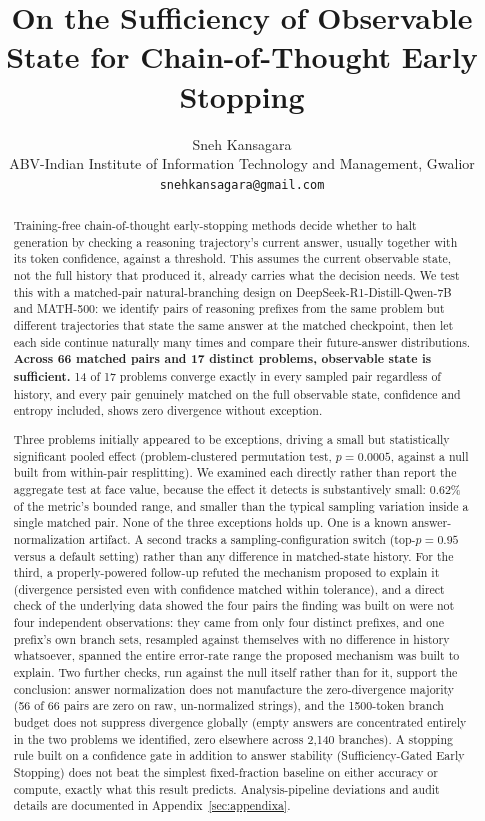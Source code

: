 \documentclass{article}
\title{On the Sufficiency of Observable State for Chain-of-Thought Early Stopping}
\author{%
  Sneh Kansagara \\
  ABV-Indian Institute of Information Technology and Management, Gwalior \\
  \texttt{snehkansagara@gmail.com} \\
}
\begin{document}
\maketitle

\begin{abstract}
Training-free chain-of-thought early-stopping methods decide whether to halt generation by checking a reasoning trajectory's current answer, usually together with its token confidence, against a threshold. This assumes the current observable state, not the full history that produced it, already carries what the decision needs. We test this with a matched-pair natural-branching design on DeepSeek-R1-Distill-Qwen-7B and MATH-500: we identify pairs of reasoning prefixes from the same problem but different trajectories that state the same answer at the matched checkpoint, then let each side continue naturally many times and compare their future-answer distributions. \textbf{Across 66 matched pairs and 17 distinct problems, observable state is sufficient.} 14 of 17 problems converge exactly in every sampled pair regardless of history, and every pair genuinely matched on the full observable state, confidence and entropy included, shows zero divergence without exception.

Three problems initially appeared to be exceptions, driving a small but statistically significant pooled effect (problem-clustered permutation test, $p=0.0005$, against a null built from within-pair resplitting). We examined each directly rather than report the aggregate test at face value, because the effect it detects is substantively small: 0.62\% of the metric's bounded range, and smaller than the typical sampling variation inside a single matched pair. None of the three exceptions holds up. One is a known answer-normalization artifact. A second tracks a sampling-configuration switch (top-$p=0.95$ versus a default setting) rather than any difference in matched-state history. For the third, a properly-powered follow-up refuted the mechanism proposed to explain it (divergence persisted even with confidence matched within tolerance), and a direct check of the underlying data showed the four pairs the finding was built on were not four independent observations: they came from only four distinct prefixes, and one prefix's own branch sets, resampled against themselves with no difference in history whatsoever, spanned the entire error-rate range the proposed mechanism was built to explain. Two further checks, run against the null itself rather than for it, support the conclusion: answer normalization does not manufacture the zero-divergence majority (56 of 66 pairs are zero on raw, un-normalized strings), and the 1500-token branch budget does not suppress divergence globally (empty answers are concentrated entirely in the two problems we identified, zero elsewhere across 2,140 branches). A stopping rule built on a confidence gate in addition to answer stability (Sufficiency-Gated Early Stopping) does not beat the simplest fixed-fraction baseline on either accuracy or compute, exactly what this result predicts. Analysis-pipeline deviations and audit details are documented in Appendix~\ref{sec:appendixa}.
\end{abstract}
\end{document}
